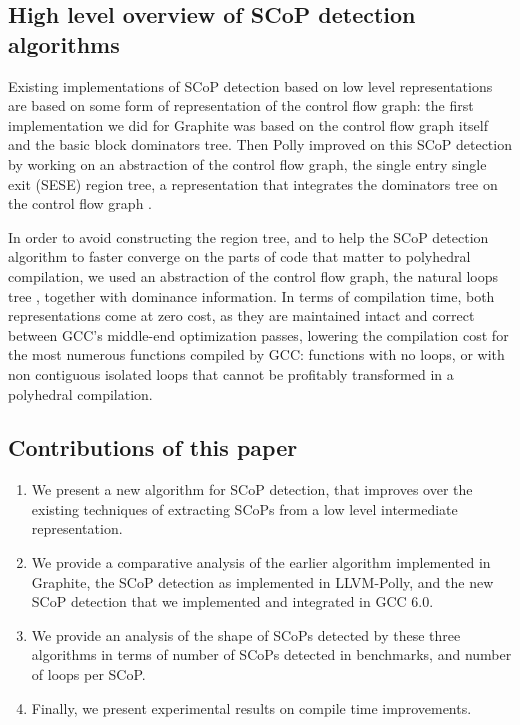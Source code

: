 \documentclass{sigplanconf}
\begin{document}
\subsection{High level overview of SCoP detection algorithms}

Existing implementations of SCoP detection based on low level representations
are based on some form of representation of the control flow graph: the first
implementation we did for Graphite \cite{graphite} was based on the control
flow graph itself and the basic block dominators tree.  Then Polly improved on
this SCoP detection \cite{polly} by working on an abstraction of the control flow graph, the
single entry single exit (SESE) region tree, a representation that integrates
the dominators tree on the control flow graph \cite{sese}.

In order to avoid constructing the region tree, and to help the SCoP detection
algorithm to faster converge on the parts of code that matter to polyhedral
compilation, we used an abstraction of the control flow graph, the natural loops
tree \cite{dragonbook}, together with dominance information.  In terms of
compilation time, both representations come at zero cost, as they are maintained
intact and correct between GCC's middle-end optimization passes, lowering the
compilation cost for the most numerous functions compiled by GCC: functions with
no loops, or with non contiguous isolated loops that cannot be profitably
transformed in a polyhedral compilation.

\subsection{Contributions of this paper}
\begin{enumerate}
  \item We present a new algorithm for SCoP detection, that improves over the
    existing techniques of extracting SCoPs from a low level intermediate
    representation.
  \item We provide a comparative analysis of the earlier algorithm implemented
    in Graphite, the SCoP detection as implemented in LLVM-Polly, and the new
    SCoP detection that we implemented and integrated in GCC 6.0.
  \item We provide an analysis of the shape of SCoPs detected by these three
    algorithms in terms of number of SCoPs detected in benchmarks, and number of
    loops per SCoP.
  \item Finally, we present experimental results on compile time improvements.
\end{enumerate}
\end{document}
